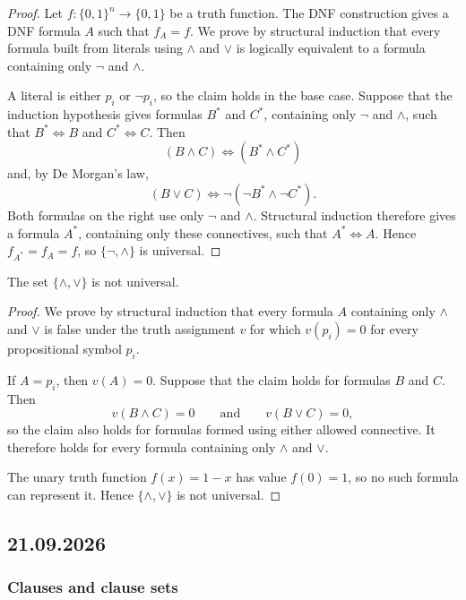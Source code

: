 \documentclass[11pt,a4paper]{amsart}
\begin{document}
\begin{proof}
  Let \(f\colon\{0,1\}^n\to\{0,1\}\) be a truth function. The DNF
  construction gives a DNF formula \(A\) such that \(f_A=f\). We prove by
  structural induction that every formula built from literals using
  \(\land\) and \(\lor\) is logically equivalent to a formula containing only
  \(\neg\) and \(\land\).

  A literal is either \(p_i\) or \(\neg p_i\), so the claim holds in the base
  case. Suppose that the induction hypothesis gives formulas \(B^*\) and
  \(C^*\), containing only \(\neg\) and \(\land\), such that
  \(B^*\Leftrightarrow B\) and \(C^*\Leftrightarrow C\). Then
  \[
    (B\land C)\Leftrightarrow(B^*\land C^*)
  \]
  and, by De Morgan's law,
  \[
    (B\lor C)\Leftrightarrow\neg(\neg B^*\land\neg C^*).
  \]
  Both formulas on the right use only \(\neg\) and \(\land\). Structural
  induction therefore gives a formula \(A^*\), containing only these
  connectives, such that \(A^*\Leftrightarrow A\). Hence
  \(f_{A^*}=f_A=f\), so \(\{\neg,\land\}\) is universal.
\end{proof}

\begin{theorem}
  The set \(\{\land,\lor\}\) is not universal.
\end{theorem}

\begin{proof}
  We prove by structural induction that every formula \(A\) containing only
  \(\land\) and \(\lor\) is false under the truth assignment \(v\) for which
  \(v(p_i)=0\) for every propositional symbol \(p_i\).

  If \(A=p_i\), then \(v(A)=0\). Suppose that the claim holds for formulas
  \(B\) and \(C\). Then
  \[
    v(B\land C)=0
    \qquad\text{and}\qquad
    v(B\lor C)=0,
  \]
  so the claim also holds for formulas formed using either allowed connective.
  It therefore holds for every formula containing only \(\land\) and \(\lor\).

  The unary truth function \(f(x)=1-x\) has value \(f(0)=1\), so no such
  formula can represent it. Hence \(\{\land,\lor\}\) is not universal.
\end{proof}

\subsection{21.09.2026}

\subsubsection{Clauses and clause sets}
\end{document}
